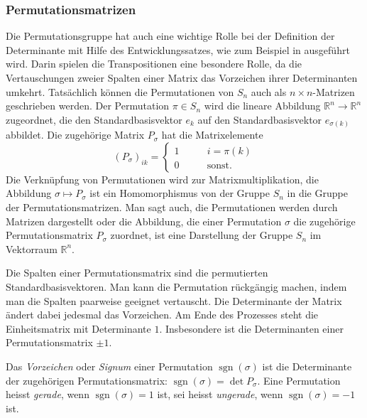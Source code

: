 \subsubsection{Permutationsmatrizen}
Die Permutationsgruppe hat auch eine wichtige Rolle bei der Definition
der Determinante mit Hilfe des Entwicklungssatzes, wie zum Beispiel
in \cite[Kapitel~4]{buch:linalg} ausgeführt wird.
Darin spielen die Transpositionen eine besondere Rolle, da die
Vertauschungen zweier Spalten einer Matrix das Vorzeichen ihrer
Determinanten umkehrt.
Tatsächlich können die Permutationen von $S_n$ auch als
$n\times n$-Matrizen geschrieben werden.
Der Permutation $\pi\in S_n$ wird die lineare Abbildung
$\mathbb{R}^n\to\mathbb{R}^n$ zugeordnet, die den Standardbasisvektor
$e_k$ auf den Standardbasisvektor $e_{\sigma(k)}$ abbildet.
Die zugehörige Matrix $P_\sigma$ hat die Matrixelemente
\[
(P_\sigma)_{ik} 
=
\begin{cases}
1&\qquad i = \pi(k)\\
0&\qquad\text{sonst}.
\end{cases}
\]
Die Verknüpfung von Permutationen wird zur Matrixmultiplikation,
die Abbildung $\sigma \mapsto P_\sigma$ ist ein Homomorphismus
von der Gruppe $S_n$ in die Gruppe der Permutationsmatrizen.
Man sagt auch, die Permutationen werden durch Matrizen dargestellt oder
die Abbildung, die einer Permutation $\sigma$ die zugehörige
Permutationsmatrix $P_\sigma$ zuordnet, ist eine Darstellung der
Gruppe $S_n$ im Vektorraum $\mathbb{R}^n$.

Die Spalten einer Permutationsmatrix sind die permutierten
Standardbasisvektoren.
Man kann die Permutation rückgängig machen, indem man die Spalten
paarweise geeignet vertauscht.
Die Determinante der Matrix ändert dabei jedesmal das Vorzeichen.
Am Ende des Prozesses steht die Einheitsmatrix mit Determinante $1$.
Insbesondere ist die Determinanten einer Permutationsmatrix $\pm 1$.

\begin{definition}
%
%
Das {\em Vorzeichen} oder {\em Signum} einer Permutation
$\operatorname{sgn}(\sigma)$
ist die Determinante der zugehörigen Permutationsmatrix:
$\operatorname{sgn}(\sigma)=\det P_\sigma$.
Eine Permutation heisst {\em gerade}, wenn $\operatorname{sgn}(\sigma)=1$ ist,
sei heisst {\em ungerade}, wenn $\operatorname{sgn}(\sigma)=-1$ ist.
%
%
\end{definition}


